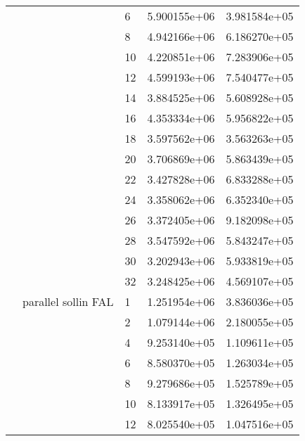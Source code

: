 \begin{tabular}{lllrr}
                      &                     & 6  &  5.900155e+06 &  3.981584e+05 \\
                      &                     & 8  &  4.942166e+06 &  6.186270e+05 \\
                      &                     & 10 &  4.220851e+06 &  7.283906e+05 \\
                      &                     & 12 &  4.599193e+06 &  7.540477e+05 \\
                      &                     & 14 &  3.884525e+06 &  5.608928e+05 \\
                      &                     & 16 &  4.353334e+06 &  5.956822e+05 \\
                      &                     & 18 &  3.597562e+06 &  3.563263e+05 \\
                      &                     & 20 &  3.706869e+06 &  5.863439e+05 \\
                      &                     & 22 &  3.427828e+06 &  6.833288e+05 \\
                      &                     & 24 &  3.358062e+06 &  6.352340e+05 \\
                      &                     & 26 &  3.372405e+06 &  9.182098e+05 \\
                      &                     & 28 &  3.547592e+06 &  5.843247e+05 \\
                      &                     & 30 &  3.202943e+06 &  5.933819e+05 \\
                      &                     & 32 &  3.248425e+06 &  4.569107e+05 \\
                      & parallel sollin FAL & 1  &  1.251954e+06 &  3.836036e+05 \\
                      &                     & 2  &  1.079144e+06 &  2.180055e+05 \\
                      &                     & 4  &  9.253140e+05 &  1.109611e+05 \\
                      &                     & 6  &  8.580370e+05 &  1.263034e+05 \\
                      &                     & 8  &  9.279686e+05 &  1.525789e+05 \\
                      &                     & 10 &  8.133917e+05 &  1.326495e+05 \\
                      &                     & 12 &  8.025540e+05 &  1.047516e+05 \\

\end{tabular}
